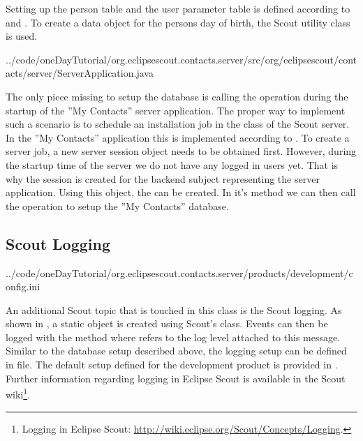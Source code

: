 \documentclass[a4paper,10pt,twoside]{book}
\begin{document}
Setting up the person table and the user parameter table is defined according to  and . 
To create a data object for the persons day of birth, the Scout utility class  is used.


{../code/oneDayTutorial/org.eclipsescout.contacts.server/src/org/eclipsescout/contacts/server/ServerApplication.java}

The only piece missing to setup the database is calling the  operation during the startup of the ''My Contacts'' server application.
The proper way to implement such a scenario is to schedule an installation job in the  class of the Scout server. 
In the ''My Contacts'' application this is implemented according to . 
To create a server job, a new server session object needs to be obtained first. 
However, during the startup time of the server we do not have any logged in users yet. 
That is why the session is created for the backend subject representing the server application. 
Using this  object, the  can be created. 
In it's  method we can then call the  operation to setup the ''My Contacts'' database.

\subsection{Scout Logging}


{../code/oneDayTutorial/org.eclipsescout.contacts.server/products/development/config.ini}

An additional Scout topic that is touched in this  class is the Scout logging. 
As shown in , a static  object is created using Scout's  class. 
Events can then be logged with the  method where  refers to the log level attached to this message. 
Similar to the database setup described above, the logging setup can be defined in  file. 
The default setup defined for the development product is provided in .
Further information regarding logging in Eclipse Scout is available in the Scout wiki\footnote{
Logging in Eclipse Scout: \url{http://wiki.eclipse.org/Scout/Concepts/Logging}.
}.
\end{document}
